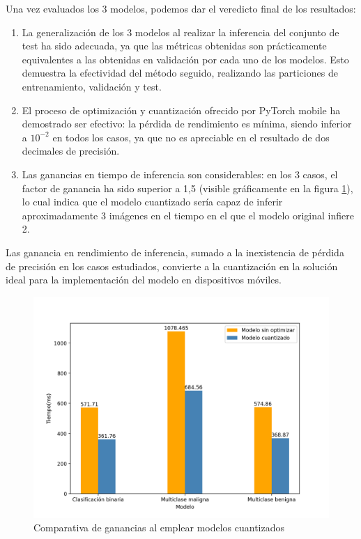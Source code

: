 Una vez evaluados los 3 modelos, podemos dar el veredicto final de los resultados:
\begin{enumerate}
	\item La generalización de los 3 modelos al realizar la inferencia del conjunto de test ha sido adecuada, ya que las métricas obtenidas son prácticamente equivalentes a las obtenidas en validación por cada uno de los modelos. Esto demuestra la efectividad del método seguido, realizando las particiones de entrenamiento, validación y test.
	\item El proceso de optimización y cuantización ofrecido por PyTorch mobile \cite{pmobile} ha demostrado ser efectivo: la pérdida de rendimiento es mínima, siendo inferior a $10^{-2}$ en todos los casos, ya que no es apreciable en el resultado de dos decimales de precisión.
	\item Las ganancias en tiempo de inferencia son considerables: en los 3 casos, el factor de ganancia ha sido superior a 1,5 (visible gráficamente en la figura \ref{fig:gananciasquant}), lo cual indica que el modelo cuantizado sería capaz de inferir aproximadamente 3 imágenes en el tiempo en el que el modelo original infiere 2. 
	\end{enumerate}
	
	Las ganancia en rendimiento de inferencia, sumado a la inexistencia de pérdida de precisión en los casos estudiados, convierte a la cuantización en la solución ideal para la implementación del modelo en dispositivos móviles.
	
	\begin{figure}[H]
		\centering
		\includegraphics[scale = 0.55]{imagenes/tiempoinferencia.png}
		\caption{Comparativa de ganancias al emplear  modelos cuantizados}
		\label{fig:gananciasquant}
	\end{figure}
